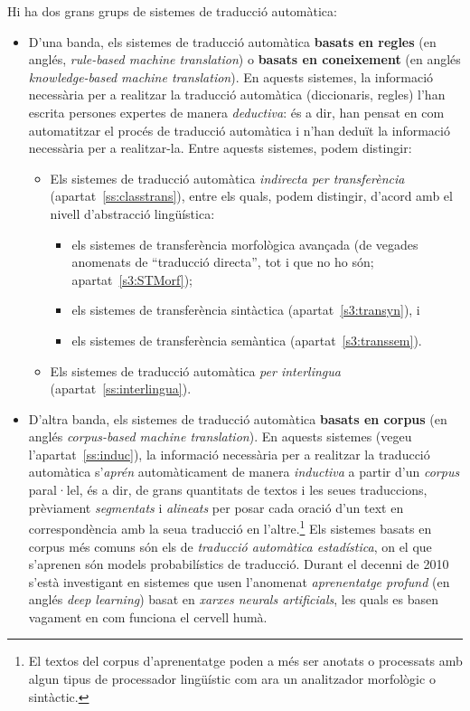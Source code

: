 Hi ha dos grans grups de sistemes de traducció automàtica:
\begin{itemize}
\item D'una banda, els sistemes de traducció automàtica \textbf{basats
    en regles} (en anglés, \emph{rule-based machine translation}) o
  \textbf{basats en coneixement} (en anglés \emph{knowledge-based
    machine translation}). En aquests sistemes, la informació
  necessària per a realitzar la traducció automàtica (diccionaris,
  regles) l'han escrita persones expertes de manera \emph{deductiva}:
  és a dir, han pensat en com automatitzar el procés de traducció
  automàtica i n'han deduït la informació necessària per a
  realitzar-la. Entre aquests sistemes, podem distingir:
  \begin{itemize}
  \item Els sistemes de traducció automàtica \emph{indirecta per
      transferència} (apartat~\ref{ss:classtrans}), entre els quals,
    podem distingir, d'acord amb el nivell d'abstracció lingüística:
    \begin{itemize}
    \item els sistemes de transferència morfològica avançada (de
      vegades anomenats de ``traducció directa'', tot i que no ho són;
      apartat~\ref{s3:STMorf});
    \item els sistemes de transferència sintàctica
      (apartat~\ref{s3:transyn}), i
    \item els sistemes de transferència semàntica
      (apartat~\ref{s3:transsem}).
    \end{itemize}
  \item Els sistemes de traducció automàtica \emph{per interlingua}
    (apartat~\ref{ss:interlingua}).
  \end{itemize}
\item D'altra banda, els sistemes de traducció automàtica
  \textbf{basats en corpus} (en anglés \emph{corpus-based machine
    translation}). En aquests sistemes (vegeu
  l'apartat~\ref{ss:induc}), la informació necessària per a realitzar
  la traducció automàtica s'\emph{aprén} automàticament de manera
  \emph{inductiva} a partir d'un \emph{corpus} paral·lel, és a dir, de
  grans quantitats de textos i les seues traduccions, prèviament
  \emph{segmentats} i \emph{alineats} per posar cada oració d'un text
  en correspondència amb la seua traducció en l'altre.\footnote{El
    textos del corpus d'aprenentatge poden a més ser anotats o
    processats amb algun tipus de processador lingüístic com ara un
    analitzador morfològic o sintàctic.} Els sistemes basats en corpus
  més comuns són els de \emph{traducció automàtica estadística}, on el
  que s'aprenen són models probabilístics de traducció. Durant el
  decenni de 2010 s'està investigant en sistemes que usen l'anomenat
  \emph{aprenentatge profund} (en anglés \emph{deep learning}) basat
  en \emph{xarxes neurals artificials}, les quals es basen vagament en
  com funciona el cervell humà. 
\end{itemize}


